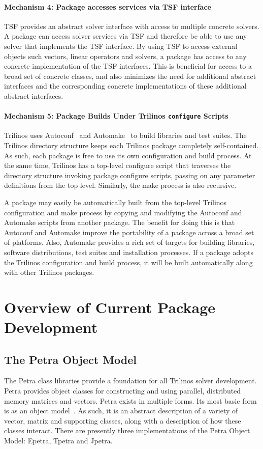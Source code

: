 \documentclass[acmtoms,acmnow]{acmtrans2m}
\begin{document}
\paragraph*{Mechanism 4: Package accesses services via TSF interface}
TSF provides an abstract solver interface with access to multiple concrete 
solvers. 
A package can access solver services via TSF and therefore be able to use
any solver that implements the TSF interface.  By using TSF to access
external objects such vectors, linear operators and solvers, a package
has access to any concrete implementation of the TSF interfaces.  This
is beneficial for access to a broad set of concrete classes, and also
minimizes the need for additional abstract interfaces and the
corresponding concrete implementations of these additional abstract interfaces.

\paragraph*{Mechanism 5: Package Builds Under Trilinos {\tt configure} Scripts}
Trilinos uses Autoconf~\cite{Autoconf} and Automake~\cite{Automake} to
build libraries and test suites.  The Trilinos directory structure
keeps each Trilinos package completely self-contained.  As such, each
package is free to use its own configuration and build process.  At
the same time, Trilinos has a top-level configure script that traverses
the directory structure invoking package configure scripts,
passing on any parameter definitions
from the top level.  Similarly, the make process is also recursive.

A package may easily be automatically built from the top-level
Trilinos configuration and make process by copying and modifying the
Autoconf and Automake scripts from another package.  The benefit for
doing this is that Autoconf and Automake improve the portability of a
package across a broad set of platforms.  Also, Automake provides a
rich set of targets for building libraries, software distributions,
test suites and installation processes.  If a package adopts the
Trilinos configuration and build process, it will be built
automatically along with other Trilinos packages.

\section{Overview of Current Package Development}
\label{sect:Software}

\subsection{The Petra Object Model}
\label{subsect:PetraObjectModel}
The Petra class libraries provide a
foundation for all Trilinos solver development.  Petra provides 
object classes for
constructing and using parallel, distributed memory matrices and vectors.  
Petra exists in
multiple forms.  Its most basic form is as an object 
model~\cite{HeroHoekWill2002}.
As such, it is an abstract 
description of a variety of vector, matrix and supporting classes, along with a 
description of
how these classes interact.  There are presently three implementations
of the Petra Object Model: Epetra, Tpetra and Jpetra.
\end{document}
